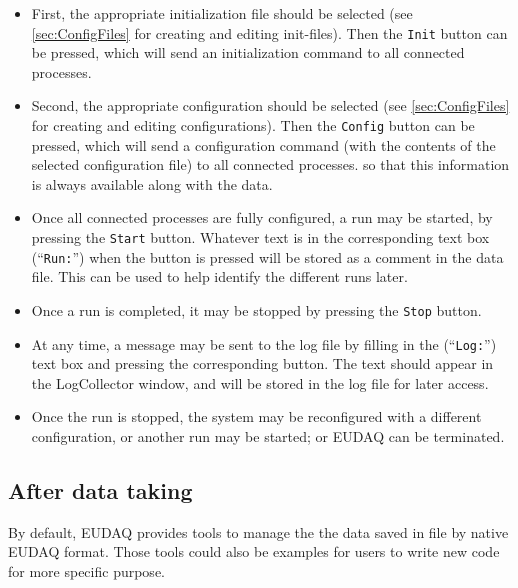 \begin{itemize}
\item First, the appropriate initialization file should be selected (see \autoref{sec:ConfigFiles} for creating and editing init-files). Then the \texttt{Init} button can be pressed,
which will send an initialization command to all connected processes.

\item Second, the appropriate configuration should be selected 
  (see \autoref{sec:ConfigFiles} for creating and editing configurations).
Then the \texttt{Config} button can be pressed,
which will send a configuration command
(with the contents of the selected configuration file) to all connected processes.
so that this information is always available along with the data.
\item Once all connected processes are fully configured, a run may be started, by pressing the \texttt{Start} button.
Whatever text is in the corresponding text box (``\texttt{Run:}'') when the button is pressed
will be stored as a comment in the data file.
This can be used to help identify the different runs later.
\item Once a run is completed, it may be stopped by pressing the \texttt{Stop} button.
\item At any time, a message may be sent to the log file by filling in the (``\texttt{Log:}'') text box and pressing the corresponding button.
The text should appear in the LogCollector window, and will be stored in the log file for later access.
\item Once the run is stopped, the system may be reconfigured with a different configuration, or another run may be started; or EUDAQ can be terminated.
  
\end{itemize}


\subsection{After data taking}
By default, EUDAQ provides tools to manage the the data saved in file by native EUDAQ format. Those tools could also be examples for users to write new code for more specific purpose. 
